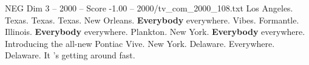 \begin{textsample}{NEG Dim 3 – 2000 – Score -1.00 – 2000/tv\_com\_2000\_108.txt}  \label{ex:f3_neg_005}
Los Angeles.
Texas.
Texas.
Texas.
New Orleans. \textbf{Everybody} everywhere.
Vibes.
Formantle.
Illinois. \textbf{Everybody} everywhere.
Plankton.
New York. \textbf{Everybody} everywhere.
Introducing the all-new Pontiac Vive.
New York.
Delaware.
Everywhere.
Delaware.
It 's getting around fast.

\end{textsample}
